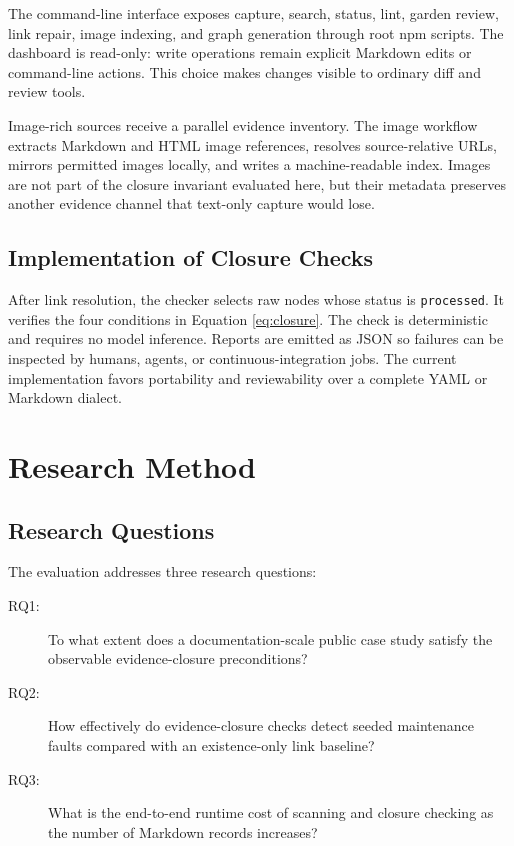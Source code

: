 \documentclass[preprint,12pt,a4paper]{elsarticle}
\begin{document}
The command-line interface exposes capture, search, status, lint, garden review,
link repair, image indexing, and graph generation through root npm scripts.
The dashboard is read-only: write operations remain explicit Markdown edits or
command-line actions. This choice makes changes visible to ordinary diff and
review tools.

Image-rich sources receive a parallel evidence inventory. The image workflow
extracts Markdown and HTML image references, resolves source-relative URLs,
mirrors permitted images locally, and writes a machine-readable index. Images
are not part of the closure invariant evaluated here, but their metadata
preserves another evidence channel that text-only capture would lose.

\subsection{Implementation of Closure Checks}

After link resolution, the checker selects raw nodes whose status is
\texttt{processed}. It verifies the four conditions in Equation
\ref{eq:closure}. The check is deterministic and requires no model inference.
Reports are emitted as JSON so failures can be inspected by humans, agents, or
continuous-integration jobs. The current implementation favors portability and
reviewability over a complete YAML or Markdown dialect.

\section{Research Method}

\subsection{Research Questions}

The evaluation addresses three research questions:

\begin{description}
  \item[RQ1:] To what extent does a documentation-scale public case study
  satisfy the observable evidence-closure preconditions?
  \item[RQ2:] How effectively do evidence-closure checks detect seeded
  maintenance faults compared with an existence-only link baseline?
  \item[RQ3:] What is the end-to-end runtime cost of scanning and closure
  checking as the number of Markdown records increases?
\end{description}
\end{document}
